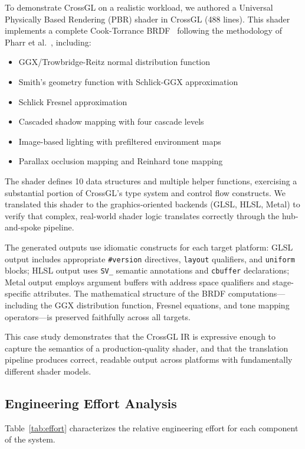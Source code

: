 \documentclass{svproc}
\begin{document}
To demonstrate CrossGL on a realistic workload, we authored a Universal Physically Based Rendering (PBR) shader in CrossGL (488 lines). This shader implements a complete Cook-Torrance BRDF~\cite{cook1982reflectance} following the methodology of Pharr et al.~\cite{pharr2023pbr}, including:

\begin{itemize}
\item GGX/Trowbridge-Reitz normal distribution function
\item Smith's geometry function with Schlick-GGX approximation
\item Schlick Fresnel approximation
\item Cascaded shadow mapping with four cascade levels
\item Image-based lighting with prefiltered environment maps
\item Parallax occlusion mapping and Reinhard tone mapping
\end{itemize}

The shader defines 10 data structures and multiple helper functions, exercising a substantial portion of CrossGL's type system and control flow constructs. We translated this shader to the graphics-oriented backends (GLSL, HLSL, Metal) to verify that complex, real-world shader logic translates correctly through the hub-and-spoke pipeline.

The generated outputs use idiomatic constructs for each target platform: GLSL output includes appropriate \texttt{\#version} directives, \texttt{layout} qualifiers, and \texttt{uniform} blocks; HLSL output uses \texttt{SV\_} semantic annotations and \texttt{cbuffer} declarations; Metal output employs argument buffers with address space qualifiers and stage-specific attributes. The mathematical structure of the BRDF computations---including the GGX distribution function, Fresnel equations, and tone mapping operators---is preserved faithfully across all targets.

This case study demonstrates that the CrossGL IR is expressive enough to capture the semantics of a production-quality shader, and that the translation pipeline produces correct, readable output across platforms with fundamentally different shader models.

\subsection{Engineering Effort Analysis}

Table~\ref{tab:effort} characterizes the relative engineering effort for each component of the system.
\end{document}
